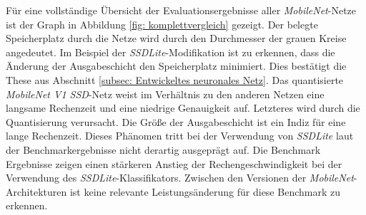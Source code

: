 Für eine vollständige Übersicht der Evaluationsergebnisse aller \textit{MobileNet}-Netze ist der Graph in Abbildung \ref{fig: komplettvergleich} gezeigt. Der belegte Speicherplatz durch die Netze wird durch den Durchmesser der grauen Kreise angedeutet. Im Beispiel der \textit{SSDLite}-Modifikation ist zu erkennen, dass die Änderung der Ausgabeschicht den Speicherplatz minimiert. Dies bestätigt die These aus Abschnitt \ref{subsec: Entwickeltes neuronales Netz}. Das quantisierte \textit{MobileNet V1 SSD}-Netz weist im Verhältnis zu den anderen Netzen eine langsame Rechenzeit und eine niedrige Genauigkeit auf. Letzteres wird durch die Quantisierung verursacht. Die Größe der Ausgabeschicht ist ein Indiz für eine lange Rechenzeit. Dieses Phänomen tritt bei der Verwendung von \textit{SSDLite} laut der Benchmarkergebnisse nicht derartig ausgeprägt auf. Die Benchmark Ergebnisse zeigen einen stärkeren Anstieg der Rechengeschwindigkeit bei der Verwendung des \textit{SSDLite}-Klassifikators. Zwischen den Versionen der \textit{MobileNet}-Architekturen ist keine relevante Leistungsänderung für diese Benchmark zu erkennen. 



